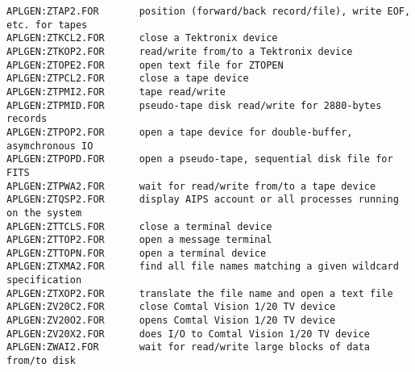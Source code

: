\begin{verbatim}
APLGEN:ZTAP2.FOR       position (forward/back record/file), write EOF, etc. for tapes
APLGEN:ZTKCL2.FOR      close a Tektronix device
APLGEN:ZTKOP2.FOR      read/write from/to a Tektronix device
APLGEN:ZTOPE2.FOR      open text file for ZTOPEN
APLGEN:ZTPCL2.FOR      close a tape device
APLGEN:ZTPMI2.FOR      tape read/write
APLGEN:ZTPMID.FOR      pseudo-tape disk read/write for 2880-bytes records
APLGEN:ZTPOP2.FOR      open a tape device for double-buffer, asymchronous IO
APLGEN:ZTPOPD.FOR      open a pseudo-tape, sequential disk file for FITS
APLGEN:ZTPWA2.FOR      wait for read/write from/to a tape device
APLGEN:ZTQSP2.FOR      display AIPS account or all processes running on the system
APLGEN:ZTTCLS.FOR      close a terminal device
APLGEN:ZTTOP2.FOR      open a message terminal
APLGEN:ZTTOPN.FOR      open a terminal device
APLGEN:ZTXMA2.FOR      find all file names matching a given wildcard specification
APLGEN:ZTXOP2.FOR      translate the file name and open a text file
APLGEN:ZV20C2.FOR      close Comtal Vision 1/20 TV device
APLGEN:ZV20O2.FOR      opens Comtal Vision 1/20 TV device
APLGEN:ZV20X2.FOR      does I/O to Comtal Vision 1/20 TV device
APLGEN:ZWAI2.FOR       wait for read/write large blocks of data from/to disk
\end{verbatim}
